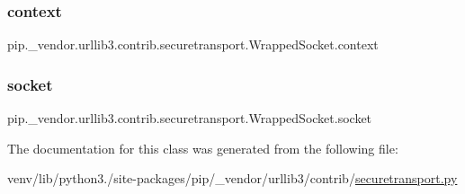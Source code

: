 \subsubsection{\texorpdfstring{context}{context}}
{\footnotesize\ttfamily pip.\+\_\+vendor.\+urllib3.\+contrib.\+securetransport.\+Wrapped\+Socket.\+context}

\mbox{\label{classpip_1_1__vendor_1_1urllib3_1_1contrib_1_1securetransport_1_1WrappedSocket_a96b68596ff2c3a48383878791990c8b0}} 
\subsubsection{\texorpdfstring{socket}{socket}}
{\footnotesize\ttfamily pip.\+\_\+vendor.\+urllib3.\+contrib.\+securetransport.\+Wrapped\+Socket.\+socket}



The documentation for this class was generated from the following file\+:\begin{DoxyCompactItemize}
\item 
venv/lib/python3./site-\/packages/pip/\+\_\+vendor/urllib3/contrib/\hyperlink{securetransport_8py}{securetransport.\+py}\end{DoxyCompactItemize}
